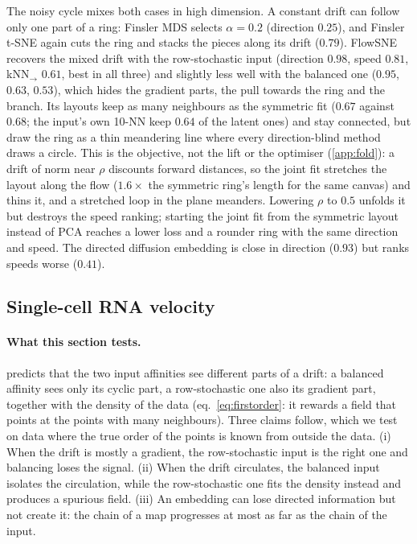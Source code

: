 The noisy cycle mixes both cases in high dimension. A constant drift can
follow only one part of a ring: Finsler MDS selects $\alpha=0.2$ (direction
$0.25$), and Finsler t-SNE again cuts the ring and stacks the pieces along
its drift ($0.79$). FlowSNE recovers the mixed drift with the
row-stochastic input (direction $0.98$, speed $0.81$, kNN$_\to$ $0.61$, best
in all three) and slightly less well with the balanced one ($0.95$, $0.63$,
$0.53$), which hides the gradient parts, the pull towards the ring and the
branch. Its layouts keep as many neighbours as the symmetric fit ($0.67$
against $0.68$; the input's own 10-NN keep $0.64$ of the latent ones) and
stay connected, but draw the ring as a thin meandering line where every
direction-blind method draws a circle. This is the objective, not the
lift or the optimiser (\cref{app:fold}): a drift of norm near $\rho$
discounts forward distances, so the joint fit stretches the layout along
the flow ($1.6\times$ the symmetric ring's length for the same canvas) and
thins it, and a stretched loop in the plane meanders. Lowering $\rho$ to
$0.5$ unfolds it but destroys the speed ranking; starting the joint fit
from the symmetric layout instead of PCA reaches a lower loss and a
rounder ring with the same direction and speed. The directed diffusion
embedding is close in direction ($0.93$) but ranks speeds worse ($0.41$).


\subsection{Single-cell RNA velocity}
\label{sec:exp_sc}

\paragraph{What this section tests.}
 predicts that the two input affinities see different
parts of a drift: a balanced affinity sees only its cyclic part, a
row-stochastic one also its gradient part, together with the density of
the data (eq.~\ref{eq:firstorder}: it rewards a field that points at the
points with many neighbours). Three claims follow, which we test on data
where the true order of the points is known from outside the data.
(i) When the drift is mostly a gradient, the row-stochastic input is the
right one and balancing loses the signal. (ii) When the drift circulates,
the balanced input isolates the circulation, while the row-stochastic one
fits the density instead and produces a spurious field. (iii) An
embedding can lose directed information but not create it: the chain of a
map progresses at most as far as the chain of the input.

